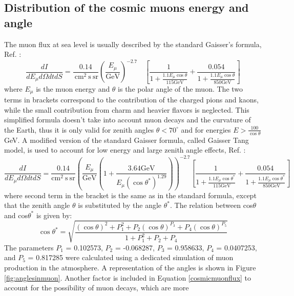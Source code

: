 \subsection{Distribution of the cosmic muons energy and angle}\label{distcos}
The muon flux at sea level is usually described by the standard Gaisser's formula, Ref. \cite{guan2015parametrization}:
\begin{equation}
    \frac{d I}{d E_\mu d \Omega d t d S}=\frac{0.14}{\mathrm{~cm}^2 \mathrm{~s} \ \mathrm{sr}}\left(\frac{E_\mu}{\mathrm{GeV}}\right)^{-2.7} \quad\left[\frac{1}{1+\frac{1.1 E_\mu \cos \theta}{115 \mathrm{GeV}}}+\frac{0.054}{1+\frac{1.1 E_\mu \cos \theta}{850 \mathrm{GeV}}}\right]
    \end{equation}
where $E_\mu$ is the muon energy and $\theta$ is the polar angle of the muon. 
The two terms in brackets correspond to the contribution of the charged pions and kaons, while 
the small contribution from charm and heavier flavors is neglected. 
This simplified formula doesn't take into account muon decays and the curvature of the Earth, 
thus it is only valid for zenith angles $\theta < 70^\circ$ and for energies $E > \frac{100}{\cos \theta}$ GeV.
A modified version of the standard Gaisser formula, called Gaisser Tang model, is used to account for low energy and large zenith angle effects, Ref. \cite{guan2015parametrization}:
\begin{equation}\label{cosmicmuonflux}
    \frac{d I}{d E_\mu d \Omega d t d S}=\frac{0.14}{\mathrm{cm}^2 \mathrm{~s} \ \mathrm{sr} }\left( \frac{E_\mu}{\mathrm{GeV}} \left(1+\frac{3.64 \mathrm{GeV}}{E_\mu\left(\cos \theta^*\right)^{1.29}}\right)\right)^{-2.7}\left[\frac{1}{1+\frac{1.1 E_\mu \cos \theta^*}{115 \mathrm{GeV}}}+\frac{0.054}{1+\frac{1.1 E_\mu \cos \theta^*}{850 \mathrm{GeV}}}\right]
\end{equation}
where second term in the bracket is the same as in the standard formula, except that the zenith angle 
$\theta$ is substituted by the angle $\theta^*$. The relation between cos$\theta$
and cos$\theta^*$ is given by:
\begin{equation}
    \cos \theta^*=\sqrt{\frac{(\cos \theta)^2+P_1^2+P_2(\cos \theta)^{P_3}+P_4(\cos \theta)^{P_5}}{1+P_1^2+P_2+P_4}}
    \end{equation}
The parameters $P_1$ = 0.102573, $P_2$ = -0.068287, $P_3$ = 0.958633, $P_4$ = 0.0407253, and $P_5$ = 0.817285 were calculated using 
a dedicated simulation of muon production in the atmosphere. A representation of the angles is shown in Figure \ref{fig:anglesinmuon}.
Another factor is included in Equation \ref{cosmicmuonflux} to account for the possibility of muon decays, which are more 
